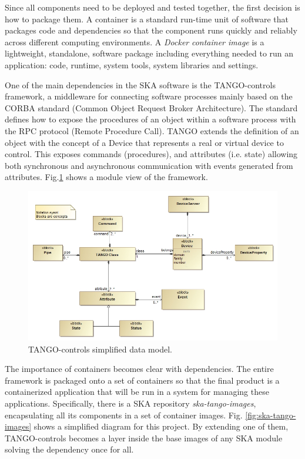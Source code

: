 \documentclass[a4paper,
	       keeplastbox,   %
	       References
	       ]{jacow}
\begin{document}
Since all components need to be deployed and tested together, the first decision is how to package them. A container is a standard run-time unit of software that packages code and dependencies so that the component runs quickly and reliably across different computing environments. A \textit{Docker}\cite{docker} \textit{container image} is a lightweight, standalone, software package including everything needed to run an application: code, runtime, system tools, system libraries and settings. 

One of the main dependencies in the SKA software is the TANGO-controls\cite{tango-controls} framework, a middleware for connecting software processes mainly based on the CORBA standard (Common Object Request Broker Architecture). The standard defines how to expose the procedures of an object within a software process with the RPC protocol (Remote Procedure Call). TANGO extends the definition of an object with the concept of a Device that represents a real or virtual device to control. This exposes commands (procedures), and attributes (i.e. state) allowing both synchronous and asynchronous communication with events generated from attributes. Fig.\ref{fig:tangodatamodel} shows a module view of the framework.

\begin{figure}[!htb]
   \centering
   \includegraphics*[width=.7\columnwidth]{SimplifiedDataModel}
   \caption{TANGO-controls simplified data model.}
   \label{fig:tangodatamodel}
\end{figure}

The importance of containers becomes clear with dependencies. The entire framework is packaged onto a set of containers \cite{ska-tango-images} so that the final product is a containerized application that will be run in a system for managing these applications. Specifically, there is a SKA repository \textit{ska-tango-images}\cite{ska-tango-images}, encapsulating all its components in a set of container images. Fig. \ref{fig:ska-tango-images} shows a simplified diagram for this project. By extending one of them, TANGO-controls becomes a layer inside the base images of any SKA module solving the dependency once for all. 
\end{document}

